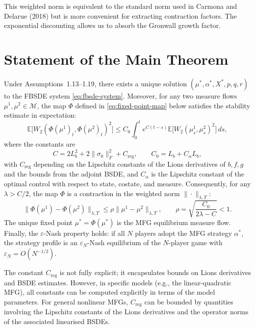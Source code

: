 \begin{remark}
This weighted norm is equivalent to the standard norm used in Carmona and Delarue
(2018) but is more convenient for extracting contraction factors. The exponential
discounting allows us to absorb the Gronwall growth factor.
\end{remark}


\section{Statement of the Main Theorem}
\label{sec:wp-main-theorem}

\begin{theorem}
\label{thm:wellposedness}
Under Assumptions~1.13--1.19, there exists a unique solution
$(\mu^*, \alpha^*, X^*, p, q, r)$ to the FBSDE system \eqref{eq:fbsde-system}. Moreover,
for any two measure flows $\mu^1, \mu^2 \in \mathcal{M}$, the map $\Phi$ defined in
\eqref{eq:fixed-point-map} below satisfies the stability estimate in expectation:
\begin{equation}
    \mathbb{E}\big[W_2(\Phi(\mu^1)_t, \Phi(\mu^2)_t)^2\big] \leq C_0 \int_0^t
    e^{C(t-s)} \mathbb{E}\big[W_2(\mu_s^1, \mu_s^2)^2\big]\, ds,
    \label{eq:stability-estimate}
\end{equation}
where the constants are
\[
    C = 2L_b^2 + 2\|\sigma_0\|_F^2 + C_{\mathrm{reg}}, \qquad
    C_0 = L_b + C_\alpha L_b,
\]
with $C_{\mathrm{reg}}$ depending on the Lipschitz constants of the Lions derivatives
of $b, f, g$ and the bounds from the adjoint BSDE, and $C_\alpha$ is the Lipschitz
constant of the optimal control with respect to state, costate, and measure.
Consequently, for any $\lambda > C/2$, the map $\Phi$ is a contraction in the weighted
norm $\|\cdot\|_{\lambda,T}$:
\begin{equation}
    \|\Phi(\mu^1) - \Phi(\mu^2)\|_{\lambda,T} \leq \rho \|\mu^1 - \mu^2\|_{\lambda,T},
    \qquad \rho = \sqrt{\frac{C_0}{2\lambda - C}} < 1.
    \label{eq:contraction}
\end{equation}
The unique fixed point $\mu^* = \Phi(\mu^*)$ is the MFG equilibrium measure flow.
Finally, the $\varepsilon$-Nash property holds: if all $N$ players adopt the MFG
strategy $\alpha^*$, the strategy profile is an $\varepsilon_N$-Nash equilibrium of the
$N$-player game with $\varepsilon_N = O(N^{-1/2})$.
\end{theorem}

\begin{remark}
The constant $C_{\mathrm{reg}}$ is not fully explicit; it encapsulates bounds on Lions
derivatives and BSDE estimates. However, in specific models (e.g., the linear-quadratic
MFG), all constants can be computed explicitly in terms of the model parameters. For
general nonlinear MFGs, $C_{\mathrm{reg}}$ can be bounded by quantities involving the
Lipschitz constants of the Lions derivatives and the operator norms of the associated
linearised BSDEs.
\end{remark}


